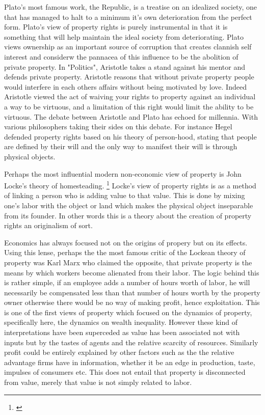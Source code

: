 \documentclass[12pt]{article}
\numberwithin{equation}{section}
\begin{document}
Plato's most famous work, the Republic, is a treatise on an idealized society, one that has managed to halt to a minimum it's own deterioration from the perfect form. Plato's view of property rights is purely instrumental in that it is something that will help maintain the ideal society from deteriorating. Plato views ownership as an important source of corruption that creates clannish self interest and considerw the pannacea of this influence to be the abolition of private property. 
In "Politics", Aristotle takes a stand against his mentor and defends private property. Aristotle reasons that without private property people would interfere in each others affairs without being motivated by love. Indeed Aristotle viewed the act of waiving your rights to property against an individual a way to be virtuous, and a limitation of this right would limit the ability to be virtuous. The debate between Aristotle and Plato has echoed for millennia. With various philosophers taking their sides on this debate. For instance Hegel defended property rights based on his theory of person-hood, stating that people are defined by their will and the only way to manifest their will is through physical objects. 

Perhaps the most influential modern non-economic view of property is John Locke's theory of homesteading. \footnote{\cite{locke2014second}} Locke's view of property rights is as a method of linking a person who is adding value to that value. This is done by mixing one's labor with the object or land which makes the physical object inseparable from its founder. In other words this is a theory about the creation of property rights an originalism of sort. 

Economics has always focused not on the origins of propery but on its effects. Using this lense, perhaps the the most famous critic of the Lockean theory of property was Karl Marx who claimed the opposite, that private property is the means by which workers become alienated from their labor. The logic behind this is rather simple, if an employee adds a number of hours worth of labor, he will necessarily be compensated less than that number of hours worth by the property owner otherwise there would be no way of making profit, hence exploitation. This is one of the first views of property which focused on the dynamics of property, specifically here, the dynamics on wealth inequality. However these kind of interpretations have been superceded as value has been associated not with inputs but by the tastes of agents and the relative scarcity of resources. Similarly profit could be entirely explained by other factors such as the the relative advantage firms have in information, whether it be an edge in production, taste, impulses of consumers etc. This does not entail that property is disconnected from value, merely that value is not simply related to labor. 
\end{document}
